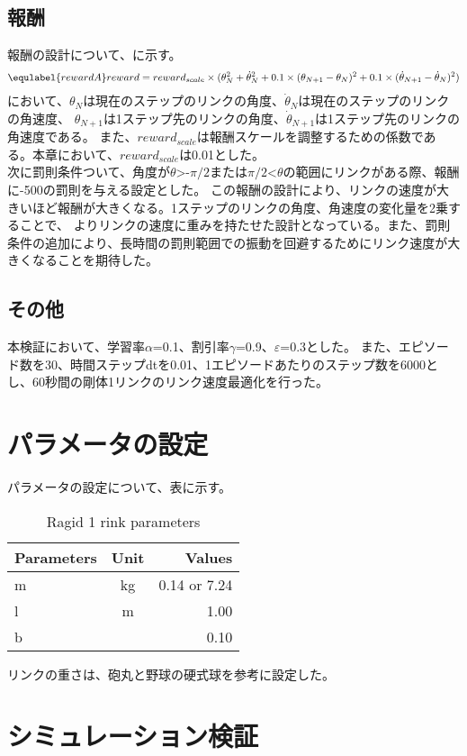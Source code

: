 \subsection{報酬}
報酬の設計について、に示す。
\begin{eqnarray}
  \equlabel{rewardA}
  reward=reward_{scale}\times(\theta_N^2+\dot{\theta}_N^2
  +0.1\times(\theta_{N+1}-\theta_N)^2
  +0.1\times(\dot{\theta}_{N+1}-\dot{\theta}_N)^2)
\end{eqnarray}
において、$\theta_N$は現在のステップのリンクの角度、$\dot{\theta}_N$は現在のステップのリンクの角速度、
$\theta_{N+1}$は1ステップ先のリンクの角度、$\dot{\theta}_{N+1}$は1ステップ先のリンクの角速度である。
また、$reward_{scale}$は報酬スケールを調整するための係数である。本章において、$reward_{scale}$は0.01とした。\\
次に罰則条件ついて、角度が$\theta$>-$\pi/2$または$\pi/2$<$\theta$の範囲にリンクがある際、報酬に-500の罰則を与える設定とした。
この報酬の設計により、リンクの速度が大きいほど報酬が大きくなる。1ステップのリンクの角度、角速度の変化量を2乗することで、
よりリンクの速度に重みを持たせた設計となっている。また、罰則条件の追加により、長時間の罰則範囲での振動を回避するためにリンク速度が大きくなることを期待した。
\subsection{その他}
本検証において、学習率$\alpha$=0.1、割引率$\gamma$=0.9、$\varepsilon$=0.3とした。
また、エピソード数を30、時間ステップdtを0.01、1エピソードあたりのステップ数を6000とし、60秒間の剛体1リンクのリンク速度最適化を行った。
\section{パラメータの設定}
パラメータの設定について、表に示す。
\begin{table}[tb]
  \begin{center}
    \caption{Ragid 1 rink parameters}
    \begin{tabular}{l|c|r}
      \hline
      Parameters & Unit & Values \\
      \hline
      m & kg & 0.14 or 7.24 \\
      l & m & 1.00 \\
      b &  & 0.10 \\
      \hline
    \end{tabular}
  \end{center}
\end{table}
リンクの重さは、砲丸と野球の硬式球を参考に設定した。
\section{シミュレーション検証}

